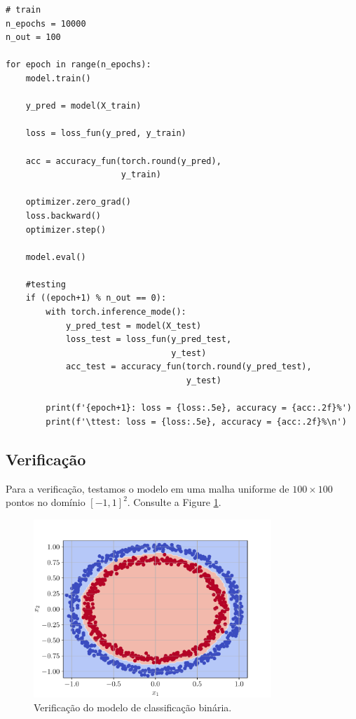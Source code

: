 \begin{lstlisting}[caption=mlp\_classbin.py, label=cap_mlp_sec_classbin:cod:classbin]
# train
n_epochs = 10000
n_out = 100

for epoch in range(n_epochs):
    model.train()

    y_pred = model(X_train)

    loss = loss_fun(y_pred, y_train)

    acc = accuracy_fun(torch.round(y_pred),
                       y_train)

    optimizer.zero_grad()
    loss.backward()
    optimizer.step()

    model.eval()

    #testing
    if ((epoch+1) % n_out == 0):
        with torch.inference_mode():
            y_pred_test = model(X_test)
            loss_test = loss_fun(y_pred_test,
                                 y_test)
            acc_test = accuracy_fun(torch.round(y_pred_test),
                                    y_test)

        print(f'{epoch+1}: loss = {loss:.5e}, accuracy = {acc:.2f}%')
        print(f'\ttest: loss = {loss:.5e}, accuracy = {acc:.2f}%\n')
\end{lstlisting}

\subsection{Verificação}

Para a verificação, testamos o modelo em uma malha uniforme de $100\times 100$ pontos no domínio $[-1, 1]^2$. Consulte a Figure \ref{cap_mlp_sec_classbin:fig:result}.

\begin{figure}[H]
  \centering
  \includegraphics[width=0.8\textwidth]{./cap_mlp/dados/fig_classbin_result/fig}
  \caption{Verificação do modelo de classificação binária.}
  \label{cap_mlp_sec_classbin:fig:result}
\end{figure}


